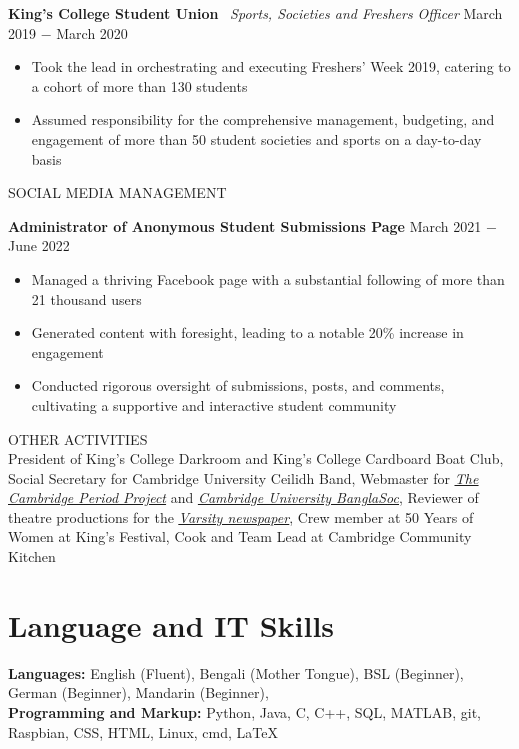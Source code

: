\documentclass{article}
\begin{document}
\textbf{King's College Student Union} \
\textit{Sports, Societies and Freshers Officer }\hfill March 2019 $-$ March 2020
\begin{itemize}
    \item Took the lead in orchestrating and executing Freshers' Week 2019, catering to a cohort of more than 130 students
    \item Assumed responsibility for the comprehensive management, budgeting, and engagement of more than 50 student societies and sports on a day-to-day basis
\end{itemize} \medskip

\uppercase{Social Media Management}

\textbf{Administrator of Anonymous Student Submissions Page} \hfill March 2021 $-$ June 2022
\begin{itemize}
    \item Managed a thriving Facebook page with a substantial following of more than 21 thousand users
    \item Generated content with foresight, leading to a notable 20\% increase in engagement
    \item Conducted rigorous oversight of submissions, posts, and comments, cultivating a supportive and interactive student community
\end{itemize} \medskip

\uppercase{Other Activities}\\
President of King's College Darkroom and King's College Cardboard Boat Club, Social Secretary for Cambridge University Ceilidh Band, Webmaster for \href{http://tcpp.soc.srcf.net/}{\underline{\textit{The Cambridge Period Project}}} and \href{https://cambridgebanglasoc.org/}{\underline{\textit{Cambridge University BanglaSoc}}}, Reviewer of theatre productions for the \href{https://www.varsity.co.uk/profile/sheamol-obeda}{\underline{\textit{Varsity newspaper}}}, Crew member at 50 Years of Women at King's Festival, Cook and Team Lead at Cambridge Community Kitchen

\medskip

\vspace{-.75\baselineskip}
\hrulefill
\vspace{-.75\baselineskip}

\section*{Language and IT Skills}
\textbf{Languages:} English (Fluent), Bengali (Mother Tongue), 
BSL (Beginner), German (Beginner), Mandarin (Beginner),  \\
\textbf{Programming and Markup:} Python, Java, C, C++, SQL, MATLAB, git, Raspbian, CSS, HTML, Linux, cmd, \LaTeX\medskip
\end{document}
